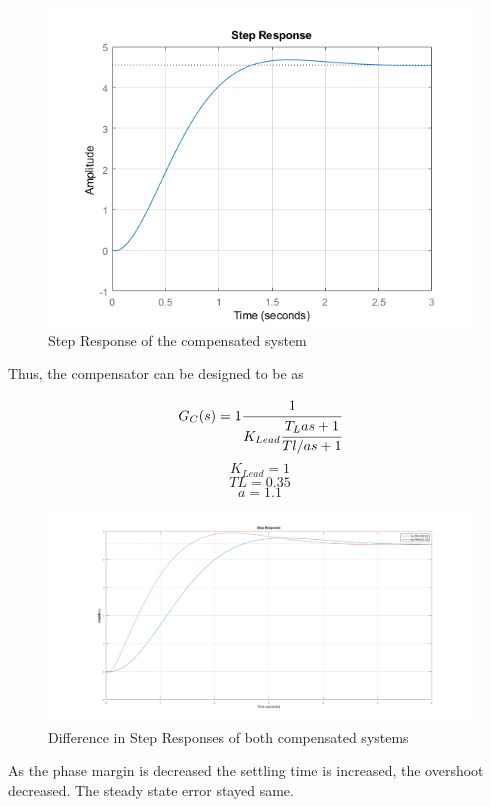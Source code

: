 \documentclass[a4paper,12pt]{article}
\begin{document}
\begin{enumerate}
	\begin{figure}[H]
			\center
			\setlength{\unitlength}{\textwidth} 
		\includegraphics[width=0.75\unitlength]{images/comped2_step}
  		\caption{\label{fig:10}Step Response of the compensated system}
	\end{figure}
	
	Thus, the compensator can be designed to be as
	
	$$ G_C(s)=1\cfrac{1}{K_{Lead}\cfrac{T_Las+1}{Tl/as+1}} $$
	$$ K_{Lead}=1 $$
	$$ TL=0.35$$
	$$ a=1.1$$
	
	

	\begin{figure}[H]
			\center
			\setlength{\unitlength}{\textwidth} 
		\includegraphics[width=0.75\unitlength]{images/step_t1}
  		\caption{\label{fig:10} Difference in Step Responses of both compensated systems}
	\end{figure}
	
	As the phase margin is decreased the settling time is increased, the overshoot decreased. The steady state error stayed same.
	

\end{enumerate}
\end{document}
